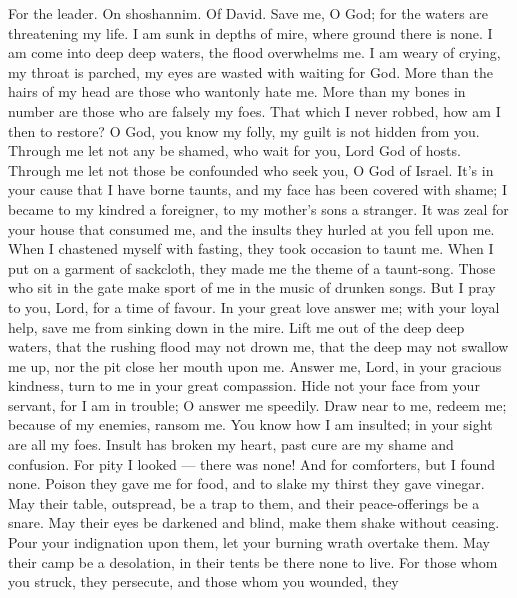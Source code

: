For the leader. On shoshannim. Of David.  Save me, O God;
for the waters are threatening my life.  I am sunk in depths
of mire, where ground there is none. I am come into deep deep waters,
the flood overwhelms me.  I am weary of crying, my throat is
parched, my eyes are wasted with waiting for God.  More than
the hairs of my head are those who wantonly hate me. More than my bones
in number are those who are falsely my foes. That which I never robbed,
how am I then to restore?  O God, you know my folly, my
guilt is not hidden from you.  Through me let not any be
shamed, who wait for you, Lord God of hosts. Through me let not those be
confounded who seek you, O God of Israel.  It's in your
cause that I have borne taunts, and my face has been covered with shame;
 I became to my kindred a foreigner, to my mother's sons a
stranger.  It was zeal for your house that consumed me, and
the insults they hurled at you fell upon me.  When I
chastened myself with fasting, they took occasion to taunt me.
 When I put on a garment of sackcloth, they made me the
theme of a taunt-song.  Those who sit in the gate make
sport of me in the music of drunken songs.  But I pray to
you, Lord, for a time of favour. In your great love answer me; with your
loyal help, save me  from sinking down in the mire. Lift me
out of the deep deep waters,  that the rushing flood may
not drown me, that the deep may not swallow me up, nor the pit close her
mouth upon me.  Answer me, Lord, in your gracious kindness,
turn to me in your great compassion.  Hide not your face
from your servant, for I am in trouble; O answer me speedily.
 Draw near to me, redeem me; because of my enemies, ransom
me.  You know how I am insulted; in your sight are all my
foes.  Insult has broken my heart, past cure are my shame
and confusion. For pity I looked --- there was none! And for comforters,
but I found none.  Poison they gave me for food, and to
slake my thirst they gave vinegar.  May their table,
outspread, be a trap to them, and their peace-offerings be a snare.
 May their eyes be darkened and blind, make them shake
without ceasing.  Pour your indignation upon them, let your
burning wrath overtake them.  May their camp be a
desolation, in their tents be there none to live.  For
those whom you struck, they persecute, and those whom you wounded, they
